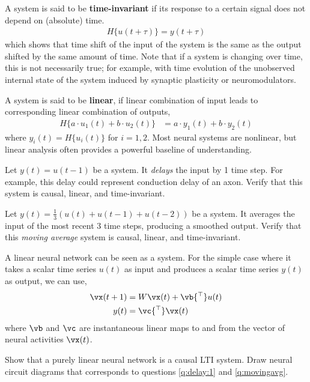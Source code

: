 \documentclass[a4paper,11pt]{exam}
\newcounter{ct}
\newcommand{\trp}{{^\top}} %
\begin{document}
\begin{questions}
A system is said to be \textbf{time-invariant} if its response to a certain signal does not depend on (absolute) time.
\begin{align}\label{eq:lti:invariant}
    H\{u(t + \tau)\} = y(t + \tau)
\end{align}
which shows that time shift of the input of the system is the same as the output shifted by the same amount of time.
Note that if a system is changing over time, this is not necessarily true; for example, with time evolution of the unobserved internal state of the system induced by synaptic plasticity or neuromodulators.

A system is said to be \textbf{linear}, if linear combination of input leads to corresponding linear combination of outputs,
\begin{align}
    H\{a \cdot u_1(t) + b \cdot u_2(t)\} &= a \cdot y_1(t) + b \cdot y_2(t)
\end{align}
where $y_i(t) = H\{u_i(t)\}$ for $i = 1, 2$.
Most neural systems are nonlinear, but linear analysis often provides a powerful baseline of understanding.

\question \label{q:delay:1}
Let $y(t) = u(t-1)$ be a system.
It \emph{delays} the input by 1 time step.
For example, this delay could represent conduction delay of an axon.
Verify that this system is causal, linear, and time-invariant.

\question \label{q:movingavg}
Let $y(t) = \frac{1}{3}\left( u(t) + u(t-1) + u(t-2) \right)$ be a system.
It averages the input of the most recent 3 time steps, producing a smoothed output.
Verify that this \emph{moving average} system is causal, linear, and time-invariant.

\clearpage
A linear neural network can be seen as a system.
For the simple case where it takes a scalar time series $u(t)$ as input and produces a scalar time series $y(t)$ as output, we can use,
\begin{align}\label{eq:dtlds:lti:1}
    \vx(t+1) &= W \vx(t) + \vb\trp u(t)
    \\
    y(t) &= \vc\trp \vx(t)
\end{align}
where $\vb$ and $\vc$ are instantaneous linear maps to and from the vector of neural activities $\vx(t)$.

\question Show that a purely linear neural network is a causal LTI system.
Draw neural circuit diagrams that corresponds to questions \ref{q:delay:1} and \ref{q:movingavg}.


\end{questions}
\end{document}
